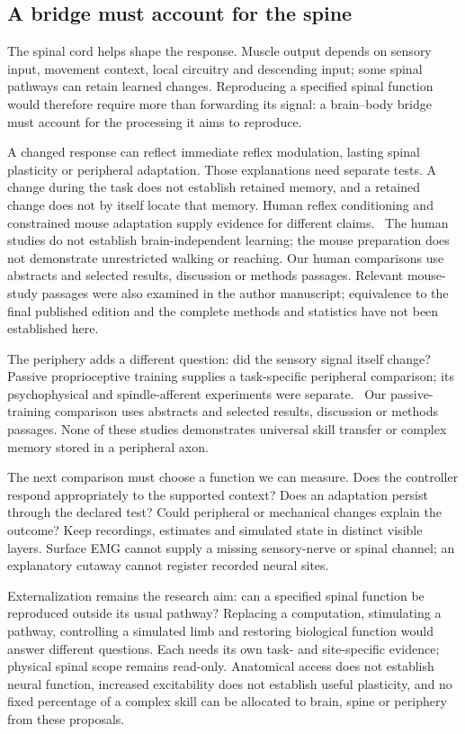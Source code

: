 \subsection{A bridge must account for the spine}

The spinal cord helps shape the response. Muscle output depends on sensory
input, movement context, local circuitry and descending input; some spinal
pathways can retain learned changes. Reproducing a specified spinal function
would therefore require more than forwarding its signal: a brain--body bridge
must account for the processing it aims to reproduce.

A changed response can reflect immediate reflex modulation, lasting spinal
plasticity or peripheral adaptation. Those explanations need separate tests.
A change during the task does not establish retained memory, and a retained
change does not by itself locate that memory. Human reflex conditioning and
constrained mouse adaptation supply evidence for different claims.~\cite{thompson2009retained,thompson2013retained,lavaud2024}
The human studies do not establish brain-independent learning; the mouse
preparation does not demonstrate unrestricted walking or reaching. Our human
comparisons use abstracts and selected results, discussion or methods passages.
Relevant mouse-study passages were also examined in the author manuscript;
equivalence to the final published edition and the complete methods and
statistics have not been established here.

The periphery adds a different question: did the sensory signal itself change?
Passive proprioceptive training supplies a task-specific peripheral comparison;
its psychophysical and spindle-afferent experiments were separate.~\cite{ackerley2022retained}
Our passive-training comparison uses abstracts and selected results, discussion
or methods passages. None of these studies demonstrates universal skill
transfer or complex memory stored in a peripheral axon.

The next comparison must choose a function we can measure. Does the controller
respond appropriately to the supported context? Does an adaptation persist
through the declared test? Could peripheral or mechanical changes explain the
outcome? Keep recordings, estimates and simulated state in distinct visible
layers. Surface EMG cannot supply a missing sensory-nerve or spinal channel;
an explanatory cutaway cannot register recorded neural sites.

Externalization remains the research aim: can a specified spinal function be
reproduced outside its usual pathway? Replacing a computation, stimulating a
pathway, controlling a simulated limb and restoring biological function would
answer different questions. Each needs its own task- and site-specific evidence;
physical spinal scope remains read-only. Anatomical access does not establish
neural function, increased excitability does not establish useful plasticity,
and no fixed percentage of a complex skill can be allocated to brain, spine
or periphery from these proposals.

